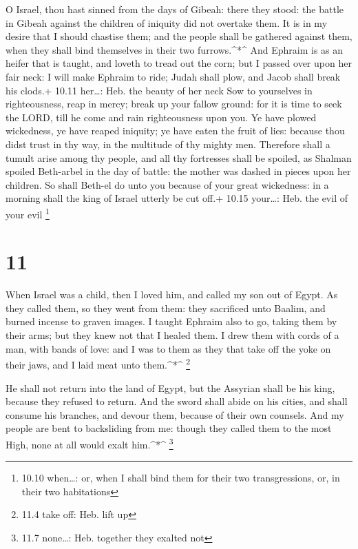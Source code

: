  O Israel, thou hast sinned from the days of Gibeah: there
they stood: the battle in Gibeah against the children of iniquity did
not overtake them.  It is in my desire that I should
chastise them; and the people shall be gathered against them, when they
shall bind themselves in their two furrows.\^{}*\^{}  And
Ephraim is as an heifer that is taught, and loveth to tread out the
corn; but I passed over upon her fair neck: I will make Ephraim to ride;
Judah shall plow, and Jacob shall break his clods.+ 10.11 her\ldots:
Heb. the beauty of her neck  Sow to yourselves in
righteousness, reap in mercy; break up your fallow ground: for it is
time to seek the LORD, till he come and rain righteousness upon you.
 Ye have plowed wickedness, ye have reaped iniquity; ye
have eaten the fruit of lies: because thou didst trust in thy way, in
the multitude of thy mighty men.  Therefore shall a tumult
arise among thy people, and all thy fortresses shall be spoiled, as
Shalman spoiled Beth-arbel in the day of battle: the mother was dashed
in pieces upon her children.  So shall Beth-el do unto you
because of your great wickedness: in a morning shall the king of Israel
utterly be cut off.+ 10.15 your\ldots: Heb. the evil of your evil
\footnote{10.10 when\ldots: or, when I shall bind them for their two
  transgressions, or, in their two habitations}

\hypertarget{section-10}{%
\section{11}\label{section-10}}

 When Israel was a child, then I loved him, and called my
son out of Egypt.  As they called them, so they went from
them: they sacrificed unto Baalim, and burned incense to graven images.
 I taught Ephraim also to go, taking them by their arms; but
they knew not that I healed them.  I drew them with cords of
a man, with bands of love: and I was to them as they that take off the
yoke on their jaws, and I laid meat unto them.\^{}*\^{} \footnote{11.4
  take off: Heb. lift up}

 He shall not return into the land of Egypt, but the
Assyrian shall be his king, because they refused to return. 
And the sword shall abide on his cities, and shall consume his branches,
and devour them, because of their own counsels.  And my
people are bent to backsliding from me: though they called them to the
most High, none at all would exalt him.\^{}*\^{} \footnote{11.7
  none\ldots: Heb. together they exalted not}

